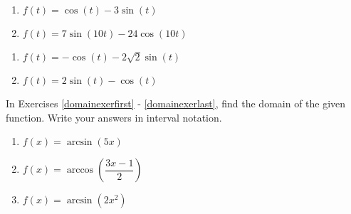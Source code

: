 \documentclass{ximera}
\begin{document}
\begin{multicols}{2}

\begin{enumerate}

\setcounter{enumi}{\value{HW}}

\item $f(t) = \cos(t) - 3\sin(t)$
\item $f(t) = 7\sin(10t) - 24\cos(10t)$

\setcounter{HW}{\value{enumi}}

\end{enumerate}

\end{multicols}

\begin{multicols}{2}

\begin{enumerate}

\setcounter{enumi}{\value{HW}}

\item $f(t) = -\cos(t) - 2\sqrt{2} \sin(t)$
\item $f(t) = 2\sin(t) - \cos(t)$ \label{rewritesinusoidlast}

\setcounter{HW}{\value{enumi}}

\end{enumerate}

\end{multicols}

In Exercises \ref{domainexerfirst} - \ref{domainexerlast}, find the domain of the given function.  Write your answers in interval notation.

\begin{multicols}{3}

\begin{enumerate}

\setcounter{enumi}{\value{HW}}

\item  $f(x) = \arcsin(5x)$  \label{domainexerfirst}
\item  $f(x) = \arccos\left(\dfrac{3x-1}{2} \right)$
\item  $f(x) = \arcsin\left(2x^2\right)$ 

\setcounter{HW}{\value{enumi}}

\end{enumerate}

\end{multicols}
\end{document}
